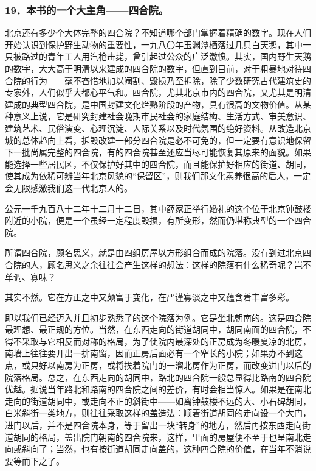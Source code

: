 \subsubsection*{19．本书的一个大主角——四合院。}
\par 北京还有多少个大体完整的四合院？不知道哪个部门掌握着精确的数字。现在人们开始认识到保护野生动物的重要性，一九八〇年玉渊潭栖落过几只白天鹅，其中一只被路过的青年工人用汽枪击毙，曾引起过公众的广泛激愤。其实，国内野生天鹅的数字，大大高于明清以来建成的四合院的数字，但直到目前，对于粗暴地对待四合院的行为——毫不吝惜地加以阉割、毁损乃至拆除，除了少数研究古代建筑史的专家外，人们似乎大都心平气和。四合院，尤其北京市内的四合院，又尤其是明清建成的典型四合院，是中国封建文化烂熟阶段的产物，具有很高的文物价值。从某种意义上说，它是研究封建社会晚期市民社会的家庭结构、生活方式、审美意识、建筑艺术、民俗演变、心理沉淀、人际关系以及时代氛围的绝好资料。从改造北京城的总体趋向上看，拆毁改建一部分四合院是必不可免的，但一定要有意识地保留下一批尚属完整的四合院，有的四合院甚至还应当尽可能恢复其原来的面貌。如果能选择一些居民区，不仅保护好其中的四合院，而且能保护好相应的街道、胡同，使其成为依稀可辨当年北京风貌的“保留区”，则我们那文化素养很高的后人，一定会无限感激我们这一代北京人的。
\par 公元一千九百八十二年十二月十二日，其中薛家正举行婚礼的这个位于北京钟鼓楼附近的小院，便是一个虽经一定程度毁损，有所变形，然而仍堪称典型的一个四合院。
\par 所谓四合院，顾名思义，就是由四组房屋以方形组合而成的院落。没有到过北京四合院的人，顾名思义之余往往会产生这样的想法：这样的院落有什么稀奇呢？岂不单调、寡味？
\par 其实不然。它在方正之中又颇富于变化，在严谨寡淡之中又蕴含着丰富多彩。
\par 即以我们已经迈入并且初步熟悉了的这个院落为例。它是坐北朝南的。这是四合院最理想、最正规的方位。当然，在东西走向的街道胡同中，胡同南面的四合院，不得不采取与它相反而对称的格局，为了使院内最深处的正房成为冬暖夏凉的北房，南墙上往往要开出一排南窗，因而正房后面必有一个窄长的小院；如果办不到这点，或只好以南房为正房，或将挨着院门的一溜北房作为正房，而改变进门以后的院落格局。总之，在东西走向的胡同中，路北的四合院一般总显得比路南的四合院优越。据说当年路北和路南的四合院之间的差价，有时会相当惊人。如果是在南北走向的街道胡同中，或走向不正的斜街中——如离钟鼓楼不远的大、小石碑胡同，白米斜街一类地方，则往往采取这样的盖造法：顺着街道胡同的走向设一个大门，进门以后，并不是四合院本身，等于留出一块“转身”的地方，然后再按东西走向街道胡同的格局，盖出院门朝南的四合院来，这样，里面的房屋便不至于也呈南北走向或斜向了；当然，也有按街道胡同走向盖的，这种四合院的价值，在当年不消说要等而下之了。

